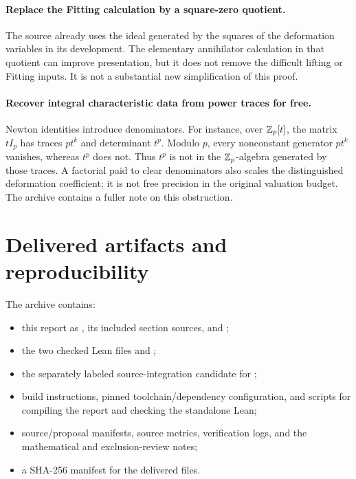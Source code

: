 \paragraph{Replace the Fitting calculation by a square-zero quotient.}
The source already uses the ideal generated by the squares of the
deformation variables in its
 development.
The elementary annihilator calculation in that quotient can improve
presentation, but it does not remove the difficult lifting or Fitting
inputs. It is not a substantial new simplification of this proof.

\paragraph{Recover integral characteristic data from power traces for free.}
Newton identities introduce denominators. For instance, over
\(\mathbb Z_p[t]\), the matrix \(tI_p\) has traces \(pt^k\) and determinant \(t^p\).
Modulo \(p\), every nonconstant generator \(pt^k\) vanishes, whereas
\(t^p\) does not. Thus \(t^p\) is not in the
\(\mathbb Z_p\)-algebra generated by those traces. A factorial paid to clear
denominators also scales the distinguished deformation coefficient;
it is not free precision in the original valuation budget.
The archive contains a fuller note on this obstruction.

\section{Delivered artifacts and reproducibility}

The archive contains:
\begin{itemize}
\item this report as , its included section
sources, and ;
\item the two checked Lean files
 and ;
\item the separately labeled source-integration candidate for
;
\item build instructions, pinned toolchain/dependency configuration,
and scripts for compiling the report and checking the standalone Lean;
\item source/proposal manifests, source metrics, verification logs,
and the mathematical and exclusion-review notes;
\item a SHA-256 manifest for the delivered files.
\end{itemize}

